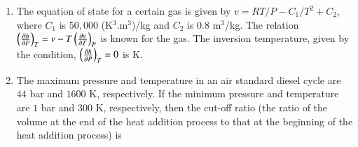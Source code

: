 \documentclass[a4paper,10pt]{article}
\begin{document}
\begin{enumerate}
    \hfill{}
    \begin{enumerate}[label=\Alph*)]
    \end{enumerate}

    \item The equation of state for a certain gas is given by $v = RT/P - C_1/T^2 + C_2$, where $C_1$ is $50,000$ (K$^3$.m$^3$)/kg and $C_2$ is $0.8$ m$^3$/kg. The relation $\left(\frac{\partial h}{\partial P}\right)_T = v - T\left(\frac{\partial v}{\partial T}\right)_P$ is known for the gas. The inversion temperature, given by the condition, $\left(\frac{\partial h}{\partial P}\right)_T = 0$ is \underline{\hspace{2cm}} K.
    
    \hfill{}
    \begin{enumerate}[label=\Alph*)]
    \end{enumerate}

    \item The maximum pressure and temperature in an air standard diesel cycle are $44$ bar and $1600$ K, respectively. If the minimum pressure and temperature are $1$ bar and $300$ K, respectively, then the cut-off ratio (the ratio of the volume at the end of the heat addition process to that at the beginning of the heat addition process) is
    
    \hfill{}
    \begin{enumerate}[label=\Alph*)]
    \end{enumerate}


\end{enumerate}
\end{document}
